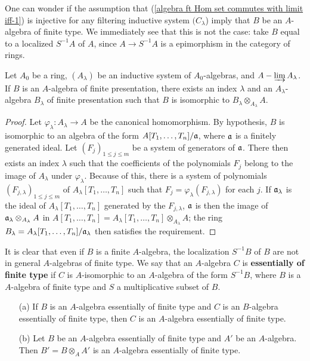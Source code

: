 \begin{remark}
One can wonder if the assumption that (\ref{algebra ft Hom set commutes with limit iff-1}) is injective for any filtering inductive system $(C_\lambda$) imply that $B$ be an $A$-algebra of finite type. We immediately see that this is not the case: take $B$ equal to a localized $S^{-1}A$ of $A$, since $A\to S^{-1}A$ is a epimorphism in the category of rings.
\end{remark}
\begin{proposition}\label{algebra fp over limit ring prop}
Let $A_0$ be a ring, $(A_\lambda)$ be an inductive system of $A_0$-algebras, and $A-\varinjlim A_\lambda$. If $B$ is an $A$-algebra of finite presentation, there exists an index $\lambda$ and an $A_\lambda$-algebra $B_\lambda$ of finite presentation such that $B$ is isomorphic to $B_\lambda\otimes_{A_\lambda}A$.
\end{proposition}
\begin{proof}
Let $\varphi_\lambda:A_\lambda\to A$ be the canonical homomorphism. By hypothesis, $B$ is isomorphic to an algebra of the form $A[T_1,\dots,T_n]/\mathfrak{a}$, where $\mathfrak{a}$ is a finitely generated ideal. Let $(F_j)_{1\leq j\leq m}$ be a system of generators of $\mathfrak{a}$. There then exists an index $\lambda$ such that the coefficients of the polynomials $F_j$ belong to the image of $A_\lambda$ under $\varphi_\lambda$. Because of this, there is a system of polynomials $(F_{j,\lambda})_{1\leq j\leq m}$ of $A_\lambda[T_1,\dots,T_n]$ such that $F_j=\varphi_\lambda(F_{j,\lambda})$ for each $j$. If $\mathfrak{a}_\lambda$ is the ideal of $A_\lambda[T_1,\dots,T_n]$ generated by the $F_{j,\lambda}$, $\mathfrak{a}$ is then the image of $\mathfrak{a}_\lambda\otimes_{A_\lambda}A$ in $A[T_1,\dots,T_n]=A_\lambda[T_1,\dots,T_n]\otimes_{A_\lambda}A$; the ring $B_\lambda=A_\lambda[T_1,\dots,T_n]/\mathfrak{a}_\lambda$ then satisfies the requirement. 
\end{proof}
\begin{remark}
It is clear that even if $B$ is a finite $A$-algebra, the localization $S^{-1}B$ of $B$ are not in general $A$-algebras of finite type. We say that an $A$-algebra $C$ is \textbf{essentially of finite type} if $C$ is $A$-isomorphic to an $A$-algebra of the form $S^{-1}B$, where $B$ is a $A$-algebra of finite type and $S$ a multiplicative subset of $B$.
\end{remark}
\begin{proposition}
\mbox{}
\begin{itemize}
\item[(a)] If $B$ is an $A$-algebra essentially of finite type and $C$ is an $B$-algebra essentially of finite type, then $C$ is an $A$-algebra essentially of finite type.
\item[(b)] Let $B$ be an $A$-algebra essentially of finite type and $A'$ be an $A$-algebra. Then $B'=B\otimes_AA'$ is an $A$-algebra essentially of finite type.
\end{itemize}
\end{proposition}
